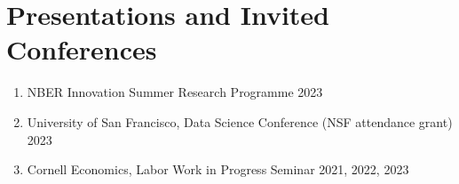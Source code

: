 \documentclass[letterpaper,11pt,oneside]{article}
\begin{document}
\section*{Presentations and Invited Conferences}
\begin{enumerate}[itemsep=2pt, label={}]
    \item NBER Innovation Summer Research Programme \hfill 2023
    \item University of San Francisco, Data Science Conference (NSF attendance grant) \hfill 2023
    \item Cornell Economics, Labor Work in Progress Seminar \hfill 2021, 2022, 2023
\end{enumerate}
\end{document}
